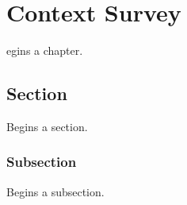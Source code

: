 \let\textcircled=\pgftextcircled
\chapter{Context Survey}
\label{chap:context-survey}

egins a chapter. 

\section{Section}
\label{sec:sec01}

Begins a section.

\subsection{Subsection}
\label{subsec:subsec01}

Begins a subsection.